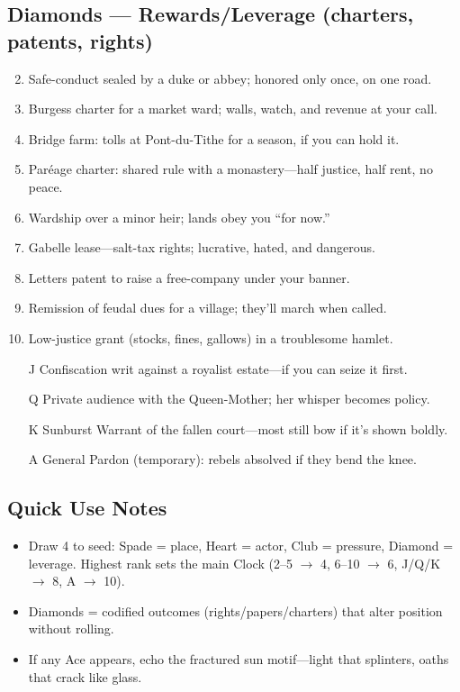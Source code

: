 \subsection*{Diamonds --- Rewards/Leverage (charters, patents, rights)}
\label{sec:vhasia-rewards}
\begin{enumerate}
\setcounter{enumi}{1}
\item Safe-conduct sealed by a duke or abbey; honored only once, on one road.
\item Burgess charter for a market ward; walls, watch, and revenue at your call.
\item Bridge farm: tolls at Pont-du-Tithe for a season, if you can hold it.
\item Paréage charter: shared rule with a monastery—half justice, half rent, no peace.
\item Wardship over a minor heir; lands obey you “for now.”
\item Gabelle lease—salt-tax rights; lucrative, hated, and dangerous.
\item Letters patent to raise a free-company under your banner.
\item Remission of feudal dues for a village; they’ll march when called.
\item Low-justice grant (stocks, fines, gallows) in a troublesome hamlet.
\item[J] Confiscation writ against a royalist estate—if you can seize it first.
\item[Q] Private audience with the Queen-Mother; her whisper becomes policy.
\item[K] Sunburst Warrant of the fallen court—most still bow if it’s shown boldly.
\item[A] General Pardon (temporary): rebels absolved if they bend the knee.
\end{enumerate}

\subsection*{Quick Use Notes}
\label{sec:vhasia-quick-use}
\begin{itemize}
\item Draw 4 to seed: Spade = place, Heart = actor, Club = pressure, Diamond = leverage. Highest rank sets the main Clock (2--5 $\rightarrow$ 4, 6--10 $\rightarrow$ 6, J/Q/K $\rightarrow$ 8, A $\rightarrow$ 10).
\item Diamonds = codified outcomes (rights/papers/charters) that alter position without rolling.
\item If any Ace appears, echo the fractured sun motif—light that splinters, oaths that crack like glass.
\end{itemize}

